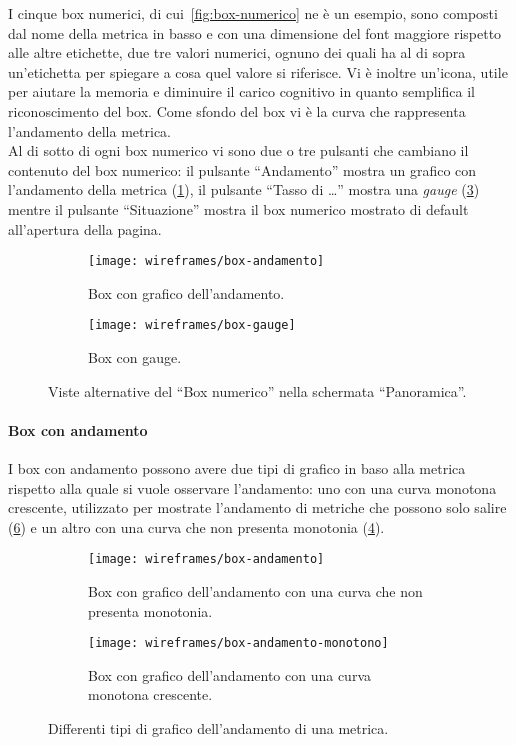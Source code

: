 I cinque box numerici, di cui~\ref{fig:box-numerico} ne è un esempio, sono composti dal nome della metrica in basso e con una dimensione del font maggiore rispetto alle altre etichette, due tre valori numerici, ognuno dei quali ha al di sopra un'etichetta per spiegare a cosa quel valore si riferisce. Vi è inoltre un'icona, utile per aiutare la memoria e diminuire il carico cognitivo in quanto semplifica il riconoscimento del box. Come sfondo del box vi è la curva che rappresenta l'andamento della metrica.\\
Al di sotto di ogni box numerico vi sono due o tre pulsanti che cambiano il contenuto del box numerico: il pulsante ``Andamento'' mostra un grafico con l'andamento della metrica (\ref{fig:box-andamento}), il pulsante ``Tasso di \dots'' mostra una \textit{gauge} (\ref{fig:box-gauge}) mentre il pulsante ``Situazione'' mostra il box numerico mostrato di default all'apertura della pagina.

\begin{figure}[H]
    \begin{subfigure}[b]{0.5\textwidth}
        \centering
        \texttt{[image: wireframes/box-andamento]}
        \caption{Box con grafico dell'andamento.}\label{fig:box-andamento}
    \end{subfigure}
\hfill
    \begin{subfigure}[b]{0.5\textwidth}
        \centering
        \texttt{[image: wireframes/box-gauge]}
        \caption{Box con gauge.}\label{fig:box-gauge}
    \end{subfigure}
    \caption{Viste alternative del ``Box numerico'' nella schermata ``Panoramica''.}
\end{figure}

\paragraph{Box con andamento}
I box con andamento possono avere due tipi di grafico in baso alla metrica rispetto alla quale si vuole osservare l'andamento: uno con una curva monotona crescente, utilizzato per mostrate l'andamento di metriche che possono solo salire (\ref{fig:box-andamento-monotono}) e un altro con una curva che non presenta monotonia (\ref{fig:box-andamento-no-monotonia}). 
\begin{figure}[H]
    \begin{subfigure}[b]{0.5\textwidth}
        \centering
        \texttt{[image: wireframes/box-andamento]}
        \caption{Box con grafico dell'andamento con una curva che non presenta monotonia.}\label{fig:box-andamento-no-monotonia}
    \end{subfigure}
\hfill
    \begin{subfigure}[b]{0.5\textwidth}
        \centering
        \texttt{[image: wireframes/box-andamento-monotono]}
        \caption{Box con grafico dell'andamento con una curva monotona crescente.}\label{fig:box-andamento-monotono}
    \end{subfigure}
    \caption{Differenti tipi di grafico dell'andamento di una metrica.}
\end{figure}

